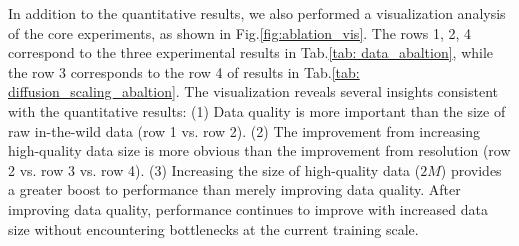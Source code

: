 In addition to the quantitative results, we also performed a visualization analysis of the core experiments, as shown in Fig.\ref{fig:ablation_vis}. The rows 1, 2, 4 correspond to the three experimental results in Tab.\ref{tab: data_abaltion}, while the row 3 corresponds to the row 4 of results in Tab.\ref{tab: diffusion_scaling_abaltion}. The visualization reveals several insights consistent with the quantitative results: (1) Data quality is more important than the size of raw in-the-wild data (row 1 vs. row 2). (2) The improvement from increasing high-quality data size is more obvious than the improvement from resolution (row 2 vs. row 3 vs. row 4). (3) Increasing the size of high-quality data ($2M$) provides a greater boost to performance than merely improving data quality. After improving data quality, performance continues to improve with increased data size without encountering bottlenecks at the current training scale.






